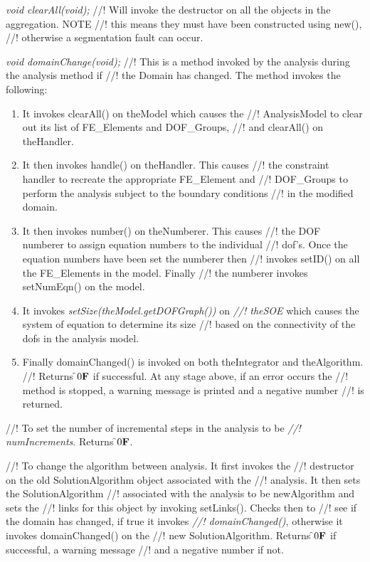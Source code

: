 {\em void clearAll(void);}
//! Will invoke the destructor on all the objects in the aggregation. NOTE
//! this means they must have been constructed using new(),
//! otherwise a segmentation fault can occur.

{\em void domainChange(void);}
//! This is a method invoked by the analysis during the analysis method if
//! the Domain has changed. The method invokes the following:
\begin{enumerate} 
\item It invokes clearAll() on \p theModel which causes the
//! AnalysisModel to clear out its list of FE\_Elements and DOF\_Groups,
//! and clearAll() on \p theHandler.
\item It then invokes handle() on \p theHandler. This causes
//! the constraint handler to recreate the appropriate FE\_Element and
//! DOF\_Groups to perform the analysis subject to the boundary conditions
//! in the modified domain.
\item It then invokes number() on \p theNumberer. This causes
//! the DOF numberer to assign equation numbers to the individual
//! dof's. Once the equation numbers have been set the numberer then
//! invokes setID() on all the FE\_Elements in the model. Finally
//! the numberer invokes setNumEqn() on the model.
\item It invokes {\em setSize(theModel.getDOFGraph())} on {\em
//! theSOE} which causes the system of equation to determine its size
//! based on the connectivity of the dofs in the analysis model. 
\item Finally domainChanged() is invoked on both \p theIntegrator and 
\p theAlgorithm. 
//! Returns \f$0{\bf F}$ if successful. At any stage above, if an error occurs the
//! method is stopped, a warning message is printed and a negative number
//! is returned. 
\end{enumerate}

//! To set the number of incremental steps in the analysis to be {\em
//! numIncrements}. Returns \f$0{\bf F}$.

//! To change the algorithm between analysis. It first invokes the
//! destructor on the old SolutionAlgorithm object associated with the
//! analysis. It then sets the SolutionAlgorithm 
//! associated with the analysis to be \p newAlgorithm and sets the
//! links for this object by invoking setLinks(). Checks then to
//! see if the domain has changed, if true it invokes {\em
//! domainChanged()}, otherwise it invokes domainChanged() on the
//! new SolutionAlgorithm. Returns \f$0{\bf F}$ if successful, a warning message
//! and a negative number if not.

